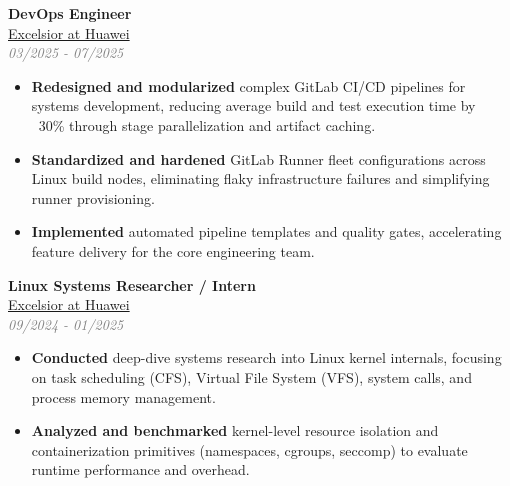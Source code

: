 \documentclass[10pt, a4paper]{article}
\begin{document}
\begin{minipage}[t]{0.55\textwidth}
\hspace{0.5cm}
\begin{minipage}[t]{0.9\textwidth}
    \raggedright
    \textbf{\Large DevOps Engineer} \\[2pt]
    \textcolor{graytext}{\href{https://rnew.tilda.ws/excelsiorathuawei}{Excelsior at Huawei}}\extlink \\
    \textcolor{graytext}{\textit{03/2025 - 07/2025}}
    \begin{itemize}
        \item \textbf{Redesigned and modularized} complex GitLab CI/CD pipelines for systems development, reducing average build and test execution time by ~30\% through stage parallelization and artifact caching.
        \item \textbf{Standardized and hardened} GitLab Runner fleet configurations across Linux build nodes, eliminating flaky infrastructure failures and simplifying runner provisioning.
        \item \textbf{Implemented} automated pipeline templates and quality gates, accelerating feature delivery for the core engineering team.
    \end{itemize}
\end{minipage}

\vspace{1cm}

\hspace{0.5cm}
\begin{minipage}[t]{0.9\textwidth}
    \raggedright
    \textbf{\Large Linux Systems Researcher / Intern} \\[2pt]
    \textcolor{graytext}{\href{https://rnew.tilda.ws/excelsiorathuawei}{Excelsior at Huawei}}\extlink \\
    \textcolor{graytext}{\textit{09/2024 - 01/2025}}
    \begin{itemize}
        \item \textbf{Conducted} deep-dive systems research into Linux kernel internals, focusing on task scheduling (CFS), Virtual File System (VFS), system calls, and process memory management.
        \item \textbf{Analyzed and benchmarked} kernel-level resource isolation and containerization primitives (namespaces, cgroups, seccomp) to evaluate runtime performance and overhead.
    \end{itemize}
\end{minipage}

\vspace{1cm}


\end{minipage}%
\end{document}
